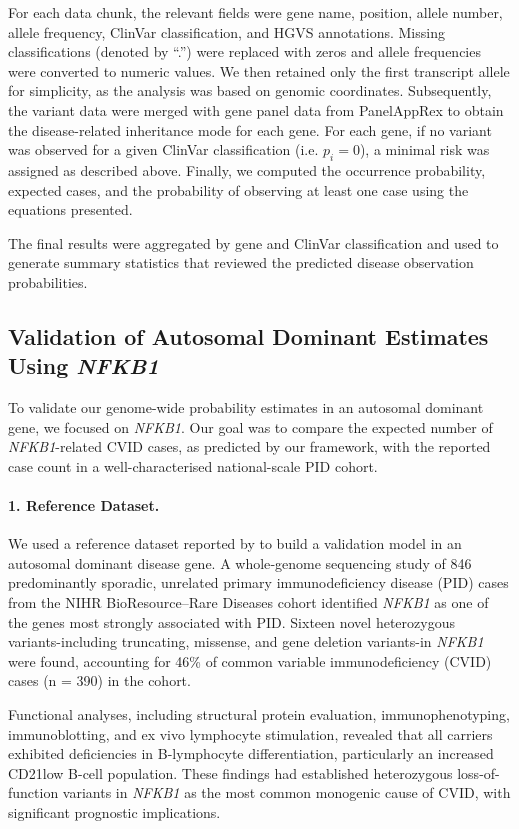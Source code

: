 For each data chunk, the relevant fields were gene name, position, allele number, allele frequency, ClinVar classification, and HGVS annotations. Missing classifications (denoted by ``.'') were replaced with zeros and allele frequencies were converted to numeric values. We then retained only the first transcript allele for simplicity, as the analysis was based on genomic coordinates. Subsequently, the variant data were merged with gene panel data from PanelAppRex to obtain the disease-related inheritance mode for each gene. For each gene, if no variant was observed for a given ClinVar classification (i.e. \(p_i = 0\)), a minimal risk was assigned as described above. Finally, we computed the occurrence probability, expected cases, and the probability of observing at least one case using the equations presented.

The final results were aggregated by gene and ClinVar classification and used to generate summary statistics that reviewed the predicted disease observation probabilities.

\subsection{Validation of Autosomal Dominant Estimates Using \textit{NFKB1}}

To validate our genome-wide probability estimates in an autosomal dominant gene, we focused on \textit{NFKB1}. Our goal was to compare the expected number of \textit{NFKB1}-related CVID cases, as predicted by our framework, with the reported case count in a well-characterised national-scale PID cohort.

\paragraph{1. Reference Dataset.}
We used a reference dataset reported by \citet{tuijnenburgNFKB12018} to build a validation model in an autosomal dominant disease gene. 
A whole‐genome sequencing study of 846 predominantly sporadic, unrelated primary immunodeficiency disease (PID) cases from the NIHR BioResource–Rare Diseases cohort  identified \textit{NFKB1} as one of the genes most strongly associated with PID. Sixteen novel heterozygous variants-including truncating, missense, and gene deletion variants-in \textit{NFKB1} were found, accounting for 46\% of common variable immunodeficiency (CVID) cases (n = 390) in the cohort. 

Functional analyses, including structural protein evaluation, immunophenotyping, immunoblotting, and ex vivo lymphocyte stimulation, revealed that all carriers exhibited deficiencies in B-lymphocyte differentiation, particularly an increased CD21low B-cell population. These findings had established heterozygous loss-of-function variants in \textit{NFKB1} as the most common monogenic cause of CVID, with significant prognostic implications.

